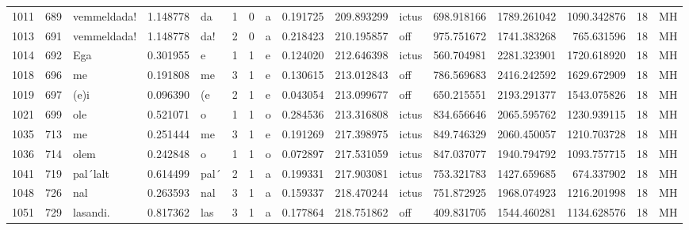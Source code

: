 \begin{tabular}{lrlrllllrrlrrrll}
1011 &         689 &      vemmeldada! &  1.148778 &      da &        1 &      0 &       a &      0.191725 &    209.893299 &  ictus &   698.918166 &  1789.261042 &  1090.342876 &     18 &        MH \\
1013 &         691 &      vemmeldada! &  1.148778 &     da! &        2 &      0 &       a &      0.218423 &    210.195857 &    off &   975.751672 &  1741.383268 &   765.631596 &     18 &        MH \\
1014 &         692 &              Ega &  0.301955 &       e &        1 &      1 &       e &      0.124020 &    212.646398 &  ictus &   560.704981 &  2281.323901 &  1720.618920 &     18 &        MH \\
1018 &         696 &               me &  0.191808 &      me &        3 &      1 &       e &      0.130615 &    213.012843 &    off &   786.569683 &  2416.242592 &  1629.672909 &     18 &        MH \\
1019 &         697 &             (e)i &  0.096390 &      (e &        2 &      1 &       e &      0.043054 &    213.099677 &    off &   650.215551 &  2193.291377 &  1543.075826 &     18 &        MH \\
1021 &         699 &              ole &  0.521071 &       o &        1 &      1 &       o &      0.284536 &    213.316808 &  ictus &   834.656646 &  2065.595762 &  1230.939115 &     18 &        MH \\
1035 &         713 &               me &  0.251444 &      me &        3 &      1 &       e &      0.191269 &    217.398975 &  ictus &   849.746329 &  2060.450057 &  1210.703728 &     18 &        MH \\
1036 &         714 &             olem &  0.242848 &       o &        1 &      1 &       o &      0.072897 &    217.531059 &  ictus &   847.037077 &  1940.794792 &  1093.757715 &     18 &        MH \\
1041 &         719 &         pal´lalt &  0.614499 &    pal´ &        2 &      1 &       a &      0.199331 &    217.903081 &  ictus &   753.321783 &  1427.659685 &   674.337902 &     18 &        MH \\
1048 &         726 &              nal &  0.263593 &     nal &        3 &      1 &       a &      0.159337 &    218.470244 &  ictus &   751.872925 &  1968.074923 &  1216.201998 &     18 &        MH \\
1051 &         729 &         lasandi. &  0.817362 &     las &        3 &      1 &       a &      0.177864 &    218.751862 &    off &   409.831705 &  1544.460281 &  1134.628576 &     18 &        MH \\

\end{tabular}
